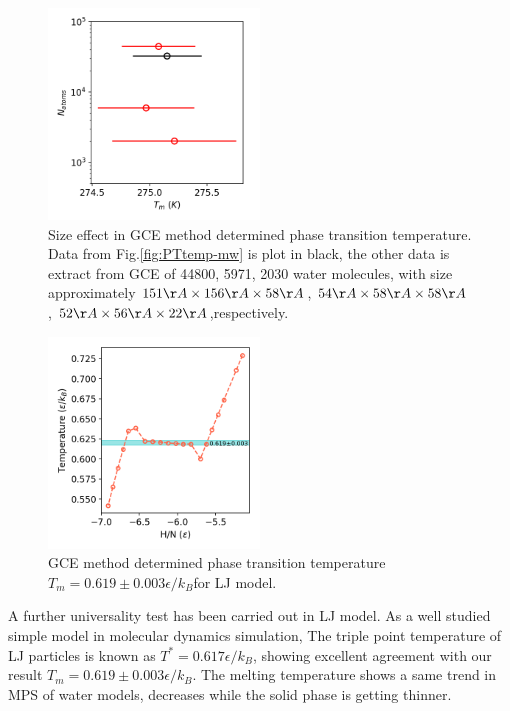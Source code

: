 \documentclass[aps,prl,twocolumn,superscriptaddress]{revtex4-1}
\begin{document}
\begin{figure}[ht]
\centering{}\includegraphics[width=0.5\textwidth]{size_effect.png} 
\caption{Size effect in GCE method determined phase transition temperature. Data from Fig.\ref{fig:PTtemp-mw} is plot in black, the other data is extract from GCE of 44800, 5971, 2030 water molecules, with size approximately $151\AA \times  156 \AA \times  58 \AA$, $54 \AA \times  58 \AA \times  58 \AA$, $52\AA \times  56 \AA \times  22\AA$,respectively.
\label{fig:sizeeffect}} 
\end{figure}


 \begin{figure}[ht]
\centering{}\includegraphics[width=0.5\textwidth]{PTtemp-lj.png} 
\caption{GCE method determined phase transition temperature $T_m=0.619\pm0.003\epsilon/k_B$for LJ model.
\label{fig:PTtemp-lj}} 
\end{figure}
A further universality test has been carried out in LJ model. As a well studied simple model in molecular dynamics simulation, The triple point temperature of LJ particles is known as $T^*=0.617\epsilon/k_B$, showing excellent agreement with our result  $T_m=0.619\pm0.003\epsilon/k_B$. The melting temperature shows a same trend in MPS of water models, decreases while the solid phase is getting thinner.  
 
\end{document}
